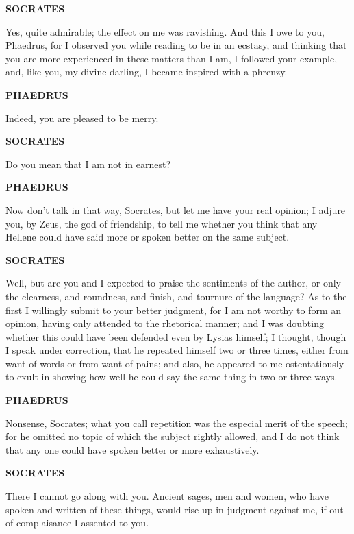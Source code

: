 \documentclass[11pt,letter]{article}
\begin{document}
\par \textbf{SOCRATES}
\par   Yes, quite admirable; the effect on me was ravishing. And this I owe to you, Phaedrus, for I observed you while reading to be in an ecstasy, and thinking that you are more experienced in these matters than I am, I followed your example, and, like you, my divine darling, I became inspired with a phrenzy.

\par \textbf{PHAEDRUS}
\par   Indeed, you are pleased to be merry.

\par \textbf{SOCRATES}
\par   Do you mean that I am not in earnest?

\par \textbf{PHAEDRUS}
\par   Now don't talk in that way, Socrates, but let me have your real opinion; I adjure you, by Zeus, the god of friendship, to tell me whether you think that any Hellene could have said more or spoken better on the same subject.

\par \textbf{SOCRATES}
\par   Well, but are you and I expected to praise the sentiments of the author, or only the clearness, and roundness, and finish, and tournure of the language? As to the first I willingly submit to your better judgment, for I am not worthy to form an opinion, having only attended to the rhetorical manner; and I was doubting whether this could have been defended even by Lysias himself; I thought, though I speak under correction, that he repeated himself two or three times, either from want of words or from want of pains; and also, he appeared to me ostentatiously to exult in showing how well he could say the same thing in two or three ways.

\par \textbf{PHAEDRUS}
\par   Nonsense, Socrates; what you call repetition was the especial merit of the speech; for he omitted no topic of which the subject rightly allowed, and I do not think that any one could have spoken better or more exhaustively.

\par \textbf{SOCRATES}
\par   There I cannot go along with you. Ancient sages, men and women, who have spoken and written of these things, would rise up in judgment against me, if out of complaisance I assented to you.
\end{document}
